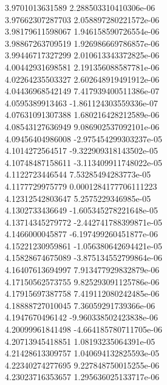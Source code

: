 {3.9701013631589 2.288503310410306e-06
 \\
3.97662307287703 2.058897280221572e-06
 \\
3.98179611598067 1.946158590726554e-06
 \\
3.98867263709519 1.926986669786857e-06
 \\
3.99446717327299 2.010613343372825e-06
 \\
4.00442931698581 2.191356088587781e-06
 \\
4.02264235503327 2.602648919491912e-06
 \\
4.04436968542149 7.417939400511386e-07
 \\
4.0595389913463 -1.861124303559336e-07
 \\
4.07631091307388 1.680216428212589e-06
 \\
4.08543127636949 9.086902537092101e-06
 \\
4.09456404986008 -2.975454299303237e-05
 \\
4.1014272564517 -9.322909318143502e-05
 \\
4.10748487158611 -3.113409911748022e-05
 \\
4.1122723446544 7.53285494283773e-05
 \\
4.1177729975779 0.0001284177706111223
 \\
4.12312542803647 5.2575229346985e-05
 \\
4.1302733436649 -1.605345278221648e-05
 \\
4.13714345279772 -2.442741788399871e-05
 \\
4.1466000045877 -6.197499260451877e-06
 \\
4.15221230959861 -1.056380642694421e-05
 \\
4.15828674675089 -3.875134552799864e-06
 \\
4.16407613694997 7.913477929832879e-06
 \\
4.17150562573755 9.825293091125786e-06
 \\
4.17915697387758 7.419112080242485e-06
 \\
4.18888727010045 7.36059291739366e-06
 \\
4.1947670496142 -9.960338502423838e-06
 \\
4.20099961841498 -4.664185780711705e-06
 \\
4.20713945418851 1.08193235064391e-05
 \\
4.21428613309757 1.040694132825593e-05
 \\
4.22340274277695 9.227848750015255e-06
 \\
4.23023716353657 1.295636025133717e-06
}
